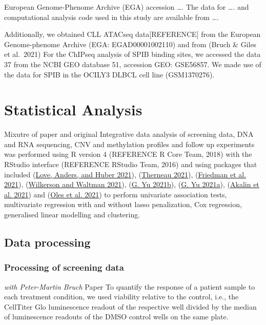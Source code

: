 \documentclass[11pt, a4paper, twosided]{book}
\begin{document}
European Genome-Phenome Archive (EGA) accession \ldots. The data for \ldots. and computational analysis code used in this study are available from \ldots.

Additionally, we obtained CLL ATACseq data{[}REFERENCE{]} from the European Genome-phenome Archive (EGA: EGAD00001002110) and from (Bruch \& Giles et al.~2021)
For the ChIPseq analysis of SPIB binding sites, we accessed the data 37 from the NCBI GEO database 51, accession GEO: GSE56857. We made use of the data for SPIB in the OCILY3 DLBCL cell line (GSM1370276).

\hypertarget{statistical-analysis}{%
\section{Statistical Analysis}\label{statistical-analysis}}

Mixutre of paper and original
Integrative data analysis of screening data, DNA and RNA sequencing, CNV and methylation profiles and follow up experiments was performed using R version 4 (REFERENCE R Core Team, 2018) with the RStudio interface (REFERENCE RStudio Team, 2016) and using packages that included (\protect\hyperlink{ref-R-DESeq2}{Love, Anders, and Huber 2021}), (\protect\hyperlink{ref-R-survival}{Therneau 2021}), (\protect\hyperlink{ref-R-glmnet}{Friedman et al. 2021}), (\protect\hyperlink{ref-R-ConsensusClusterPlus}{Wilkerson and Waltman 2021}), (\protect\hyperlink{ref-R-clusterProfiler}{G. Yu 2021b}), (\protect\hyperlink{ref-R-ChIPseeker}{G. Yu 2021a}), (\protect\hyperlink{ref-R-genomation}{Akalin et al. 2021}) and (\protect\hyperlink{ref-R-BloodCancerMultiOmics2017}{Oles et al. 2021}) to perform univariate association tests, multivariate regression with and without lasso penalization, Cox regression, generalised linear modelling and clustering.

\hypertarget{data-processing}{%
\subsection{Data processing}\label{data-processing}}

\hypertarget{processing-of-screening-data}{%
\subsubsection{Processing of screening data}\label{processing-of-screening-data}}

\emph{with Peter-Martin Bruch} Paper
To quantify the response of a patient sample to each treatment condition, we used viability relative to the control, i.e., the CellTiter Glo luminescence readout of the respective well divided by the median of luminescence readouts of the DMSO control wells on the same plate.
\end{document}
